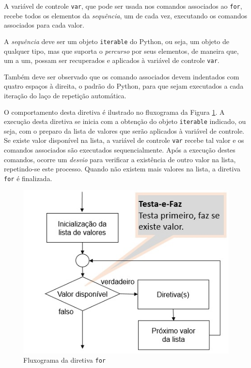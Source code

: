\documentclass[
]{book}
\begin{document}
A variável de controle \texttt{var}, que pode ser usada nos comandos associados ao \texttt{for}, recebe todos os elementos da \emph{sequência}, um de cada vez, executando os comandos associados para cada valor.

A \emph{sequência} deve ser um objeto \texttt{iterable} do Python, ou seja, um objeto de qualquer tipo, mas que suporta o \emph{percurso} por seus elementos, de maneira que, um a um, possam ser recuperados e aplicados à variável de controle \texttt{var}.

Também deve ser observado que os comando associados devem indentados com quatro espaços à direita, o padrão do Python, para que sejam executados a cada iteração do laço de repetição automática.

O comportamento desta diretiva é ilustrado no fluxograma da Figura \ref{fig:05-05}. A execução desta diretiva se inicia com a obtenção do objeto \texttt{iterable} indicado, ou seja, com o preparo da lista de valores que serão aplicados à variável de controle. Se existe valor disponível na lista, a variável de controle \texttt{var} recebe tal valor e os comandos associados são executados sequencialmente. Após a execução destes comandos, ocorre um \emph{desvio} para verificar a existência de outro valor na lista, repetindo-se este processo. Quando não existem mais valores na lista, a diretiva \texttt{for} é finalizada.

\begin{figure}
\centering
\includegraphics{images/05-05.jpg}
\caption{\label{fig:05-05}Fluxograma da diretiva \texttt{for}}
\end{figure}
\end{document}
